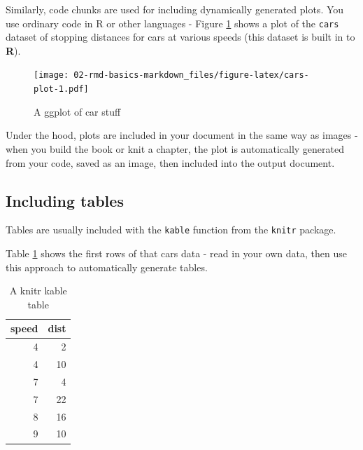 \documentclass[a4paper,nobind]{templates/ociamthesis}
\newenvironment{Shaded}{\begin{snugshade}}{\end{snugshade}}
\newcommand{\DataTypeTok}[1]{\textcolor[rgb]{0.13,0.29,0.53}{#1}}
\newcommand{\KeywordTok}[1]{\textcolor[rgb]{0.13,0.29,0.53}{\textbf{#1}}}
\newcommand{\NormalTok}[1]{#1}
\newcommand{\OperatorTok}[1]{\textcolor[rgb]{0.81,0.36,0.00}{\textbf{#1}}}
\newcommand{\StringTok}[1]{\textcolor[rgb]{0.31,0.60,0.02}{#1}}
\renewenvironment{Shaded}
{
  \vspace{10pt}%
  \begin{snugshade}%
}{%
  \end{snugshade}%
  \vspace{8pt}%
}
\begin{document}
Similarly, code chunks are used for including dynamically generated
plots. You use ordinary code in R or other languages - Figure
\ref{fig:cars-plot} shows a plot of the \texttt{cars} dataset of
stopping distances for cars at various speeds (this dataset is built in
to \textbf{R}).

\begin{Shaded}
\end{Shaded}

\begin{figure}
\centering
\texttt{[image: 02-rmd-basics-markdown\_files/figure-latex/cars-plot-1.pdf]}
\caption{\label{fig:cars-plot}A ggplot of car stuff}
\end{figure}

Under the hood, plots are included in your document in the same way as
images - when you build the book or knit a chapter, the plot is
automatically generated from your code, saved as an image, then included
into the output document.

\subsection{Including tables}\label{including-tables}

Tables are usually included with the \texttt{kable} function from the
\texttt{knitr} package.

Table \ref{tab:cars-table} shows the first rows of that cars data - read
in your own data, then use this approach to automatically generate
tables.

\begin{Shaded}
\end{Shaded}

\begin{table}

\caption{\label{tab:cars-table}A knitr kable table}
\centering
\begin{tabular}[t]{r|r}
\hline
speed & dist\\
\hline
4 & 2\\
\hline
4 & 10\\
\hline
7 & 4\\
\hline
7 & 22\\
\hline
8 & 16\\
\hline
9 & 10\\
\hline
\end{tabular}
\end{table}
\end{document}
